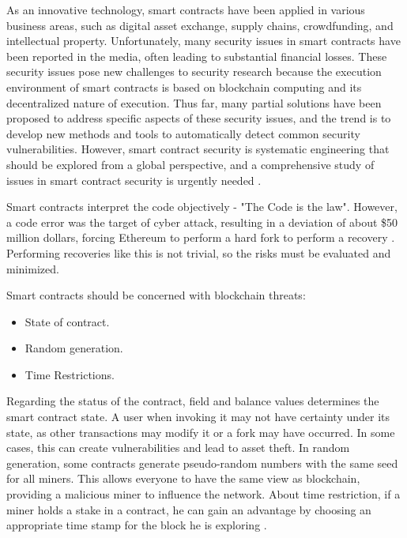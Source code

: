 As an innovative technology, smart contracts have been applied in various business areas, such as digital asset exchange, supply chains, crowdfunding, and intellectual property. Unfortunately, many security issues in smart contracts have been reported in the media, often leading to substantial financial losses. These security issues pose new challenges to security research because the execution environment of smart contracts is based on blockchain computing and its decentralized nature of execution. Thus far, many partial solutions have been proposed to address specific aspects of these security issues, and the trend is to develop new methods and tools to automatically detect common security vulnerabilities. However, smart contract security is systematic engineering that should be explored from a global perspective, and a comprehensive study of issues in smart contract security is urgently needed \cite{huang2019smart}.

Smart contracts interpret the code objectively - "The Code is the law". However, a code error was the target of cyber attack, resulting in a deviation of about \$50 million dollars, forcing Ethereum to perform a hard fork to perform a recovery \cite{bashir2018mastering}. Performing recoveries like this is not trivial, so the risks must be evaluated and minimized.

Smart contracts should be concerned with blockchain threats:
\begin{itemize}
\item State of contract.
\item Random generation.
\item Time Restrictions.
\end{itemize}

Regarding the status of the contract, field and balance values determines the smart contract state. A user when invoking it may not have certainty under its state, as other transactions may modify it or a fork may have occurred. In some cases, this can create vulnerabilities and lead to asset theft. In random generation, some contracts generate pseudo-random numbers with the same seed for all miners. This allows everyone to have the same view as blockchain, providing a malicious miner to influence the network. About time restriction, if a miner holds a stake in a contract, he can gain an advantage by choosing an appropriate time stamp for the block he is exploring \cite{greve2018blockchain}.